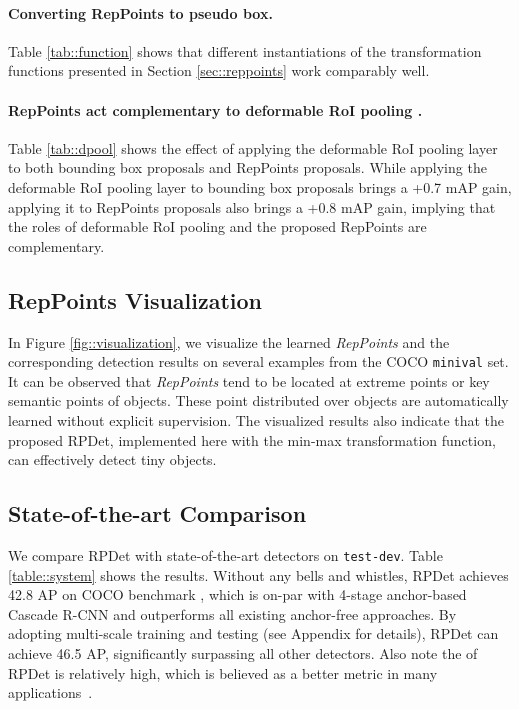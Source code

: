 \documentclass[10pt,twocolumn,letterpaper]{article}
\begin{document}
\vspace{-5pt}
\paragraph{Converting RepPoints to pseudo box.}
Table \ref{tab::function} shows that different instantiations of the transformation functions  presented in Section \ref{sec::reppoints} work comparably well.

\vspace{-5pt}
\paragraph{RepPoints act complementary to deformable RoI pooling \cite{DCN}.}
Table \ref{tab::dpool} shows the effect of applying the deformable RoI pooling layer \cite{DCN} to both bounding box proposals and RepPoints proposals. While applying the deformable RoI pooling layer to bounding box proposals brings a +0.7 mAP gain, applying it to RepPoints proposals also brings a +0.8 mAP gain, implying that the roles of deformable RoI pooling and the proposed RepPoints are complementary.

\subsection{RepPoints Visualization}
In Figure \ref{fig::visualization}, we visualize the learned \textit{RepPoints} and the corresponding detection results on several examples from the COCO \cite{MSCOCO} \texttt{minival} set. It can be observed that \textit{RepPoints} tend to be located at extreme points or key semantic points of objects. These point distributed over objects are automatically learned without explicit supervision. The visualized results also indicate that the proposed RPDet, implemented here with the min-max transformation function, can effectively detect tiny objects.

\subsection{State-of-the-art Comparison}
We compare RPDet with state-of-the-art detectors on \texttt{test-dev}. Table \ref{table::system} shows the results. Without any bells and whistles, RPDet achieves 42.8 AP on COCO benchmark \cite{MSCOCO}, which is on-par with 4-stage anchor-based Cascade R-CNN \cite{Cascade-rcnn} and outperforms all existing anchor-free approaches. By adopting multi-scale training and testing (see Appendix for details), RPDet can achieve 46.5 AP, significantly surpassing all other detectors. Also note the  of RPDet is relatively high, which is believed as a better metric in many applications~\cite{YOLOv3}. 
\end{document}
